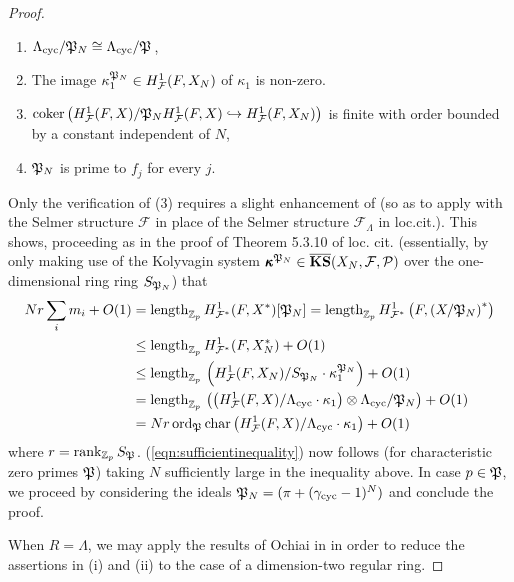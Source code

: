 \documentclass[12pt]{amsart}
\numberwithin{equation}{section}
\begin{document}
\begin{proof}
\begin{enumerate}
\item ${\Lambda}_{\textup{cyc}}/\frak{P}_N\cong {\Lambda}_{\textup{cyc}}/\frak{P}$\,, 
\item The image $\kappa_1^{\frak{P}_N}\in H^1_{\mathcal{F}}(F,X_N)$ of $\kappa_1$ is non-zero. 
\item $\textup{coker}\left(H^1_{\mathcal{F}}(F,X)/\frak{P}_NH^1_{\mathcal{F}}(F,X) \hookrightarrow H^1_{\mathcal{F}}(F,X_N)\right)$ is finite with order bounded by a constant independent of $N$,
\item $\frak{P}_N$ is prime to $f_j$ for every $j$.
\end{enumerate}  
 Only the verification of (3) requires a slight enhancement of \cite[Proposition 5.3.14]{mr02} (so as to apply with the Selmer structure ${\mathcal{F}}$ in place of the Selmer structure ${\mathcal{F}}_{\Lambda}$ in loc.cit.). This shows, proceeding as in the proof of Theorem 5.3.10 of loc. cit. (essentially, by only making use of the Kolyvagin system $\pmb{\kappa}^{\frak{P}_N}\in  \overline{\mathbf{KS}}(X_N,{\mathcal{F}},{\mathcal{P}})$ over the one-dimensional ring ring $S_{\frak{P}_N}$) that 
 \begin{align*}Nr\sum_{i}m_i +O(1)&=\textup{length}_{{\mathbb{Z}}_p}\,H^1_{{\mathcal{F}}^*}(F,X^*)[\frak{P}_N]=\textup{length}_{{\mathbb{Z}}_p}\,H^1_{{\mathcal{F}}^*}\left(F,\left(X/\frak{P}_N\right)^*\right)
 \\&\leq \textup{length}_{{\mathbb{Z}}_p}\,H^1_{{\mathcal{F}}^*}(F,X_N^*) +O(1)\\
 &\leq \textup{length}_{{\mathbb{Z}}_p}\,\left(H^1_{\mathcal{F}}(F,X_N)/S_{\frak{P}_N}\cdot\kappa_1^{\frak{P}_N}\right) +O(1) \\
 &=\textup{length}_{{\mathbb{Z}}_p}\,\left(\left(H^1_{\mathcal{F}}(F,X)/{\Lambda}_{\textup{cyc}}\cdot\kappa_1 \right)\otimes {\Lambda}_{\textup{cyc}}/{\frak{P}_N}\right) +O(1) 
 \\&= Nr\,\textup{ord}_{\frak{P}}\, \textup{char}\left(H^1_{\mathcal{F}}(F,X)/{\Lambda}_{\textup{cyc}}\cdot\kappa_1\right)+O(1)
 \end{align*}
where $r=\textup{rank}_{{\mathbb{Z}}_p}\,S_{\frak{P}}$.  (\ref{eqn:sufficientinequality}) now follows (for characteristic zero primes $\frak{P}$) taking $N$ sufficiently large in the inequality above. In case $p\in \frak{P}$, we proceed by considering the ideals $\frak{P}_N=(\pi+(\gamma_{\textup{cyc}}-1)^N)$ and conclude the proof. 

When $R={\Lambda}$, we may apply the results of Ochiai in \cite[\S3]{ochiaideform} in order to reduce the assertions in (i) and (ii) to the case of a dimension-two regular ring. 
\end{proof}
\end{document}
